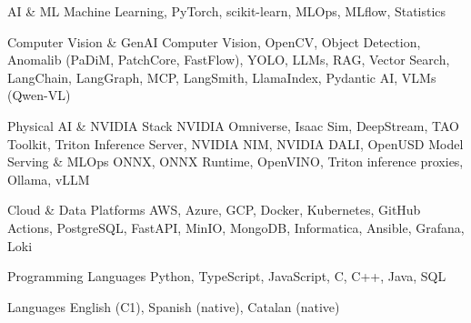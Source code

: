 


\begin{cvskills}

\cvskill
{AI \& ML}
{Machine Learning, PyTorch, scikit-learn, MLOps, MLflow, Statistics}

\cvskill
{Computer Vision \& GenAI}
{Computer Vision, OpenCV, Object Detection, Anomalib (PaDiM, PatchCore, FastFlow), YOLO, LLMs, RAG, Vector Search, LangChain, LangGraph, MCP, LangSmith, LlamaIndex, Pydantic AI, VLMs (Qwen-VL)}

\cvskill
{Physical AI \& NVIDIA Stack}
{NVIDIA Omniverse, Isaac Sim, DeepStream, TAO Toolkit, Triton Inference Server, NVIDIA NIM, NVIDIA DALI, OpenUSD}
\cvskill
{Model Serving \& MLOps}
{ONNX, ONNX Runtime, OpenVINO, Triton inference proxies, Ollama, vLLM}


\cvskill
{Cloud \& Data Platforms}
{AWS, Azure, GCP, Docker, Kubernetes, GitHub Actions, PostgreSQL, FastAPI, MinIO, MongoDB, Informatica, Ansible, Grafana, Loki}

\cvskill
{Programming Languages}
{Python, TypeScript, JavaScript, C, C++, Java, SQL}

\cvskill
{Languages}
{English (C1), Spanish (native), Catalan (native)}

\end{cvskills}